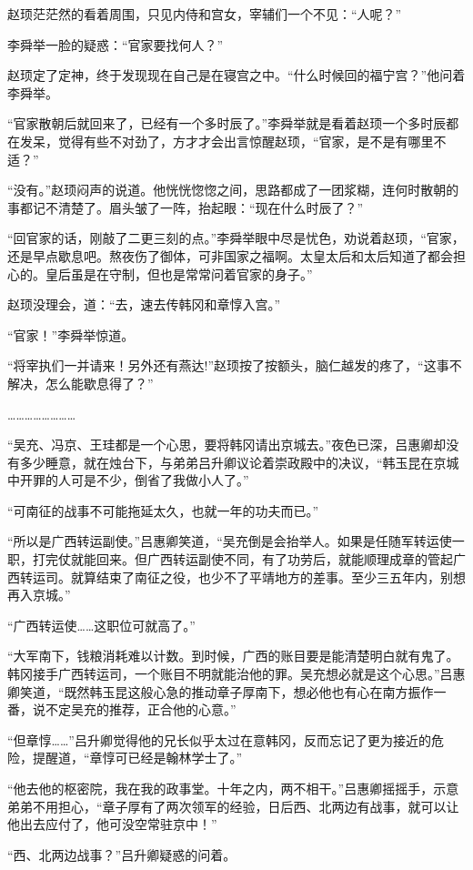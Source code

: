 赵顼茫茫然的看着周围，只见内侍和宫女，宰辅们一个不见：“人呢？”

李舜举一脸的疑惑：“官家要找何人？”

赵顼定了定神，终于发现现在自己是在寝宫之中。“什么时候回的福宁宫？”他问着李舜举。

“官家散朝后就回来了，已经有一个多时辰了。”李舜举就是看着赵顼一个多时辰都在发呆，觉得有些不对劲了，方才才会出言惊醒赵顼，“官家，是不是有哪里不适？”

“没有。”赵顼闷声的说道。他恍恍惚惚之间，思路都成了一团浆糊，连何时散朝的事都记不清楚了。眉头皱了一阵，抬起眼：“现在什么时辰了？”

“回官家的话，刚敲了二更三刻的点。”李舜举眼中尽是忧色，劝说着赵顼，“官家，还是早点歇息吧。熬夜伤了御体，可非国家之福啊。太皇太后和太后知道了都会担心的。皇后虽是在守制，但也是常常问着官家的身子。”

赵顼没理会，道：“去，速去传韩冈和章惇入宫。”

“官家！”李舜举惊道。

“将宰执们一并请来！另外还有燕达!”赵顼按了按额头，脑仁越发的疼了，“这事不解决，怎么能歇息得了？”

……………………

“吴充、冯京、王珪都是一个心思，要将韩冈请出京城去。”夜色已深，吕惠卿却没有多少睡意，就在烛台下，与弟弟吕升卿议论着崇政殿中的决议，“韩玉昆在京城中开罪的人可是不少，倒省了我做小人了。”

“可南征的战事不可能拖延太久，也就一年的功夫而已。”

“所以是广西转运副使。”吕惠卿笑道，“吴充倒是会抬举人。如果是任随军转运使一职，打完仗就能回来。但广西转运副使不同，有了功劳后，就能顺理成章的管起广西转运司。就算结束了南征之役，也少不了平靖地方的差事。至少三五年内，别想再入京城。”

“广西转运使……这职位可就高了。”

“大军南下，钱粮消耗难以计数。到时候，广西的账目要是能清楚明白就有鬼了。韩冈接手广西转运司，一个账目不明就能治他的罪。吴充想必就是这个心思。”吕惠卿笑道，“既然韩玉昆这般心急的推动章子厚南下，想必他也有心在南方振作一番，说不定吴充的推荐，正合他的心意。”

“但章惇……”吕升卿觉得他的兄长似乎太过在意韩冈，反而忘记了更为接近的危险，提醒道，“章惇可已经是翰林学士了。”

“他去他的枢密院，我在我的政事堂。十年之内，两不相干。”吕惠卿摇摇手，示意弟弟不用担心，“章子厚有了两次领军的经验，日后西、北两边有战事，就可以让他出去应付了，他可没空常驻京中！”

“西、北两边战事？”吕升卿疑惑的问着。

